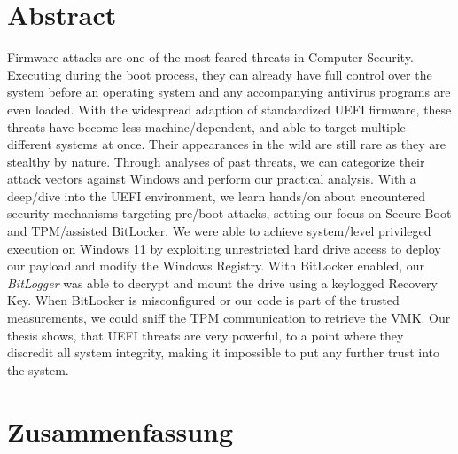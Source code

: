 

\chapter*{Abstract}
\label{sec:abstract}
\thispagestyle{empty}

Firmware attacks are one of the most feared threats in Computer Security.
Executing during the boot process, they can already have full control over the system before an operating system and any accompanying antivirus programs are even loaded.
With the widespread adaption of standardized \acf{UEFI} firmware, these threats have become less machine\-/dependent, and able to target multiple different systems at once.
Their appearances in the wild are still rare as they are stealthy by nature.
Through analyses of past threats, we can categorize their attack vectors against Windows and perform our practical analysis.
With a deep\-/dive into the \ac{UEFI} environment, we learn hands\-/on about encountered security mechanisms targeting pre\-/boot attacks, setting our focus on Secure Boot and \acf{TPM}\-/assisted BitLocker.
We were able to achieve system\-/level privileged execution on Windows 11 by exploiting unrestricted hard drive access to deploy our payload and modify the Windows Registry.
With BitLocker enabled, our \emph{BitLogger} was able to decrypt and mount the drive using a keylogged Recovery Key.
When BitLocker is misconfigured or our code is part of the trusted measurements, we could sniff the \acs{TPM} communication to retrieve the \acs{VMK}.
Our thesis shows, that \acs{UEFI} threats are very powerful, to a point where they discredit all system integrity, making it impossible to put any further trust into the system.

\acresetall

\chapter*{Zusammenfassung}
\thispagestyle{empty}
\label{sec:zusammenfassung}

